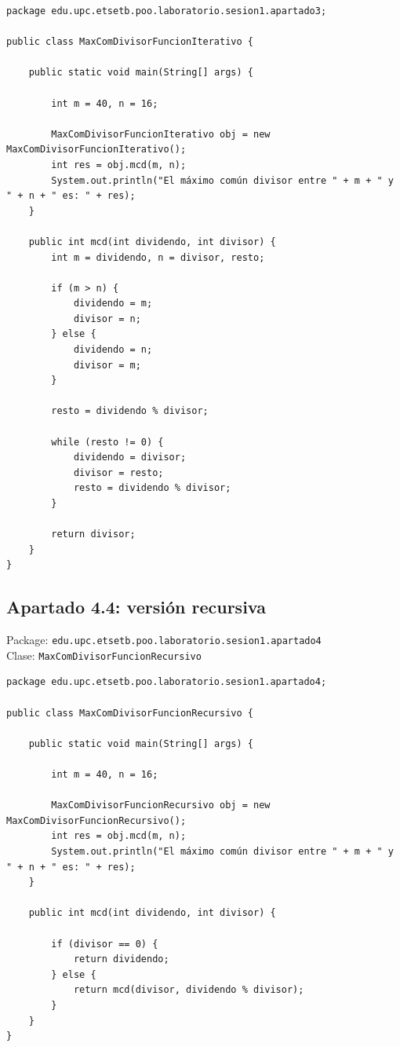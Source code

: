 \documentclass[11pt,a4paper]{article}
\begin{document}
\begin{lstlisting}
package edu.upc.etsetb.poo.laboratorio.sesion1.apartado3;

public class MaxComDivisorFuncionIterativo {

    public static void main(String[] args) {

        int m = 40, n = 16;

        MaxComDivisorFuncionIterativo obj = new MaxComDivisorFuncionIterativo();
        int res = obj.mcd(m, n);
        System.out.println("El máximo común divisor entre " + m + " y " + n + " es: " + res);
    }

    public int mcd(int dividendo, int divisor) {
        int m = dividendo, n = divisor, resto;

        if (m > n) {
            dividendo = m;
            divisor = n;
        } else {
            dividendo = n;
            divisor = m;
        }

        resto = dividendo % divisor;

        while (resto != 0) {
            dividendo = divisor;
            divisor = resto;
            resto = dividendo % divisor;
        }

        return divisor;
    }
}
\end{lstlisting}

\subsection{Apartado 4.4: versión recursiva}
Package: \texttt{edu.upc.etsetb.poo.laboratorio.sesion1.apartado4}\\
Clase: \texttt{MaxComDivisorFuncionRecursivo}

\begin{lstlisting}
package edu.upc.etsetb.poo.laboratorio.sesion1.apartado4;

public class MaxComDivisorFuncionRecursivo {

    public static void main(String[] args) {

        int m = 40, n = 16;

        MaxComDivisorFuncionRecursivo obj = new MaxComDivisorFuncionRecursivo();
        int res = obj.mcd(m, n);
        System.out.println("El máximo común divisor entre " + m + " y " + n + " es: " + res);
    }

    public int mcd(int dividendo, int divisor) {

        if (divisor == 0) {
            return dividendo;
        } else {
            return mcd(divisor, dividendo % divisor);
        }
    }
}
\end{lstlisting}
\end{document}
